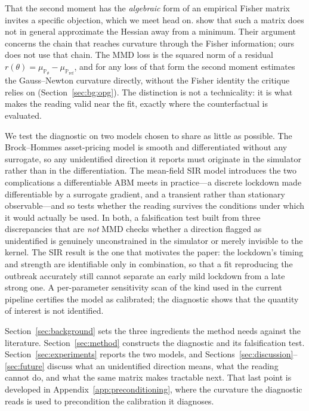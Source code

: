 \documentclass[10pt,twocolumn]{article}
\newcommand{\Prob}{\mathbb{P}}
\newcommand{\muref}{\mu_{\Prob_{\mathrm{ref}}}}
\newcommand{\mutheta}{\mu_{\Prob_\theta}}
\begin{document}
That the second moment has the \emph{algebraic} form of an empirical Fisher matrix
invites a specific objection, which we meet head on. \citet{kunstner2019limitations}
show that such a matrix does not in general approximate the Hessian away from a
minimum. Their argument concerns the chain that reaches curvature through the Fisher
information; ours does not use that chain. The MMD loss is the squared norm of a
residual $r(\theta) = \mutheta - \muref$, and for any loss of that form the second
moment estimates the Gauss--Newton curvature directly, without the Fisher identity
the critique relies on (Section~\ref{sec:bg:opg}). The distinction is not a
technicality: it is what makes the reading valid near the fit, exactly where the
counterfactual is evaluated.

We test the diagnostic on two models chosen to share as little as possible. The
Brock--Hommes asset-pricing model \citep{brock1998heterogeneous} is smooth and
differentiated without any surrogate, so any unidentified direction it reports must
originate in the simulator rather than in the differentiation. The mean-field SIR
model introduces the two complications a differentiable ABM meets in practice---a
discrete lockdown made differentiable by a surrogate gradient, and a transient
rather than stationary observable---and so tests whether the reading survives the
conditions under which it would actually be used. In both, a falsification test
built from three discrepancies that are \emph{not} MMD checks whether a direction
flagged as unidentified is genuinely unconstrained in the simulator or merely
invisible to the kernel. The SIR result is the one that motivates the paper: the
lockdown's timing and strength are identifiable only in combination, so that a fit
reproducing the outbreak accurately still cannot separate an early mild lockdown
from a late strong one. A per-parameter sensitivity scan of the kind used in the
current pipeline \citep{querabofarull2025automatic} certifies the model as
calibrated; the diagnostic shows that the quantity of interest is not identified.

Section~\ref{sec:background} sets the three ingredients the method needs against the
literature. Section~\ref{sec:method} constructs the diagnostic and its falsification
test. Section~\ref{sec:experiments} reports the two models, and
Sections~\ref{sec:discussion}--\ref{sec:future} discuss what an unidentified
direction means, what the reading cannot do, and what the same matrix makes
tractable next. That last point is developed in Appendix~\ref{app:preconditioning},
where the curvature the diagnostic reads is used to precondition the calibration it
diagnoses.
\end{document}
